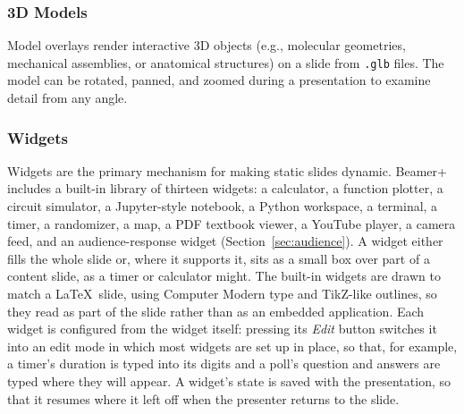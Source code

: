 \documentclass[sigconf]{acmart}
\begin{document}
\subsubsection{3D Models}
Model overlays render interactive 3D objects (e.g., molecular geometries, mechanical assemblies, or anatomical structures) on a slide from \texttt{.glb} files. The model can be rotated, panned, and zoomed during a presentation to examine detail from any angle.

\subsubsection{Widgets}
Widgets are the primary mechanism for making static slides dynamic. Beamer+ includes a built-in library of thirteen widgets: a calculator, a function plotter, a circuit simulator, a Jupyter-style notebook, a Python workspace, a terminal, a timer, a randomizer, a map, a PDF textbook viewer, a YouTube player, a camera feed, and an audience-response widget (Section~\ref{sec:audience}). A widget either fills the whole slide or, where it supports it, sits as a small box over part of a content slide, as a timer or calculator might. The built-in widgets are drawn to match a \LaTeX\ slide, using Computer Modern type and TikZ-like outlines, so they read as part of the slide rather than as an embedded application. Each widget is configured from the widget itself: pressing its \emph{Edit} button switches it into an edit mode in which most widgets are set up in place, so that, for example, a timer's duration is typed into its digits and a poll's question and answers are typed where they will appear. A widget's state is saved with the presentation, so that it resumes where it left off when the presenter returns to the slide.

\end{document}
